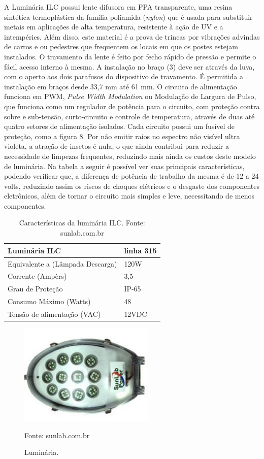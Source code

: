 \begin{enumerate}
	A Luminária ILC possui lente difusora em PPA transparente, uma resina sintética termoplástica da família poliamida (\textit{nylon}) que é usada para substituir metais em aplicações de alta temperatura, resistente à  ação de UV e a intempéries. Além disso, este material é a prova de trincas por vibrações advindas de carros e ou pedestres que frequentem os locais em que os postes estejam instalados. O travamento da lente é feito por fecho rápido de pressão e permite o fácil acesso interno à  mesma. A instalação no braço (3) deve ser através da luva, com o aperto aos dois parafusos do dispositivo de travamento. É permitida a instalação em braços desde 33,7 mm até 61 mm. 
	O circuito de alimentação funciona em PWM, \textit{Pulse Width Modulation} ou Modulação de Largura de Pulso, que funciona como um regulador de potência para o circuito, com proteção contra sobre e sub-tensão, curto-circuito e controle de temperatura, através de duas até quatro setores de alimentação isolados. Cada circuito possui um fusível de proteção, como a figura 8. Por não emitir raios no espectro não visível ultra violeta, a atração de insetos é nula, o que ainda contribui para reduzir a necessidade de limpezas frequentes, reduzindo mais ainda os custos deste modelo de luminária. Na tabela a seguir é possível ver suas principais características, podendo verificar que, a diferença de potência de trabalho da mesma é de 12 a 24 volts, reduzindo assim os riscos de choques elétricos e o desgaste dos componentes eletrônicos, além de tornar o circuito mais simples e leve, necessitando de menos componentes.


\begin{table}[H]
\center
\caption{Características da luminária ILC. Fonte: sunlab.com.br}
\begin{tabular}{|l|l|}
\hline
Luminária ILC                    & linha 315 \\ \hline
Equivalente a (Lâmpada Descarga) & 120W      \\ \hline
Corrente (Ampèrs)                & 3,5       \\ \hline
Grau de Proteção                 & IP-65     \\ \hline
Consumo Máximo (Watts)           & 48        \\ \hline
Tensão de alimentação (VAC)      & 12VDC     \\ \hline
\end{tabular}
\end{table}

\begin{figure}[H]
	 \centering
	\label{Luminária}
	 \includegraphics[keepaspectratio=true,scale=0.8]{postes/9.png}
	 \caption{Luminária.}
	 \small{Fonte: sunlab.com.br}
\end{figure}


\end{enumerate}
